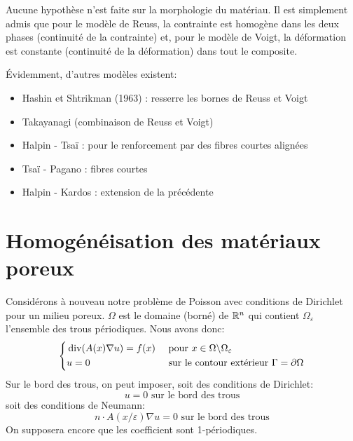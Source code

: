 Aucune hypothèse n'est faite sur la morphologie du matériau.
Il est simplement admis que pour le modèle de Reuss, la contrainte est homogène dans les deux
phases (continuité de la contrainte) et, pour le modèle de Voigt,
la déformation est constante  (continuité de la déformation) dans tout le composite.


\medskip
Évidemment, d'autres modèles existent:
\begin{itemize}
	\item Hashin et Shtrikman (1963) : resserre les bornes de Reuss et Voigt
	\item Takayanagi (combinaison de Reuss et Voigt)
	\item Halpin - Tsaï : pour le renforcement par des fibres courtes alignées
	\item Tsaï - Pagano : fibres courtes
	\item Halpin - Kardos : extension de la précédente
\end{itemize}



\medskip
\section{Homogénéisation des matériaux poreux}
Considérons à nouveau notre problème de Poisson avec conditions de Dirichlet pour un milieu
poreux.
$\Omega$ est le domaine (borné) de $\mathbb R^n$ qui contient $\Omega_\varepsilon$ l'ensemble des trous
périodiques.
Nous avons donc:
\begin{equation}
\left\{
\begin{aligned}
&\operatorname{div}(A(x)\nabla u) = f(x) &&\text{ pour } x\in\Omega\backslash\Omega_\varepsilon\\
&u=0 && \text{ sur le contour extérieur } \Gamma=\partial\Omega\\
\end{aligned}
\right.
\end{equation}
Sur le bord des trous, on peut imposer, soit des conditions de Dirichlet:
\begin{equation}u=0 \text{ sur le bord des trous} \end{equation}
soit des conditions de Neumann:
\begin{equation}n\cdot A(x/\varepsilon)\nabla u=0 \text{ sur le bord des trous}\end{equation}
On supposera encore que les coefficient sont 1-périodiques.
\medskip
{}

